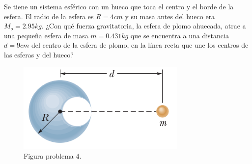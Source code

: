 \begin{mdframed}[style=warning]
	\begin{ejercicio}
		Se tiene un sistema esférico con un hueco que toca el centro y el borde de la esfera. El radio de la esfera es $R = 4cm$ y su masa antes del hueco era $M_o = 2.95kg$. ¿Con qué fuerza gravitatoria, la esfera de plomo ahuecada, atrae a una pequeña esfera de masa $m = 0.431kg$ que se encuentra a una distancia $d = 9cm$ del centro de la esfera de plomo, en la línea recta que une los centros de las esferas y del hueco?
		\begin{figure}[H]
			\centering
			\includegraphics[scale=0.5]{./img/p4.png}
			\caption{Figura problema 4.}
			\label{p4}
		\end{figure}
	\end{ejercicio}
\end{mdframed}















